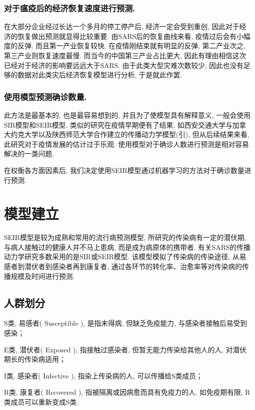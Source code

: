 \documentclass[lang=cn,11pt]{elegantpaper}
\begin{document}
\subsubsection*{对于瘟疫后的经济恢复速度进行预测. }
在大部分企业经过长达一个多月的停工停产后, 经济一定会受到重创, 因此对于经济的恢复做出预测就显得比较重要. 由SARS后的恢复曲线来看, 疫情过后会有小幅度的反弹. 而且第一产业恢复较快, 在疫情刚结束就有明显的反弹, 第二产业次之, 第三产业则恢复速度最慢. 而当今的中国第三产业占比更大, 因此有理由相信这次已经对于经济的影响要远远大于SARS. 由于此类大型灾难次数较少, 因此也没有足够的数据对此类灾后经济恢复模型进行分析, 于是就此作罢. 
\subsubsection*{使用模型预测确诊数量. }
此方法是最基本的, 也是最容易想到的, 并且为了使模型具有解释意义, 一般会使用SIR模型和SEIR模型. 类似的研究在疫情早期便有了结果, 如西安交通大学与加拿大约克大学以及陕西师范大学合作建立的传播动力学模型(引), 但从后续结果来看, 此研究对于疫情发展的估计过于乐观. 使用模型对于确诊人数进行预测是相对容易解决的一类问题. 

在权衡各方面因素后, 我们决定使用SEIR模型通过机器学习的方法对于确诊数量进行预测.
\section{模型建立} 
SEIR模型是较为成熟和常用的流行病预测模型, 所研究的传染病有一定的潜伏期, 与病人接触过的健康人并不马上患病, 而是成为病原体的携带者. 有关SARS的传播动力学研究多数采用的是SIR或SEIR模型. 该模型模拟了传染病的传染途径, 从易感者到潜伏者到感染者再到康复者, 通过各环节的转化率、治愈率等对传染病的传播规模及时间进行预测. 
\subsection{人群划分}
S类, 易感者( Susceptible ), 是指未得病, 但缺乏免疫能力, 与感染者接触后易受到感染；

E类, 潜伏者( Exposed ), 指接触过感染者, 但暂无能力传染给其他人的人, 对潜伏期长的传染病适用；

I类, 感染者( Infective ), 指染上传染病的人, 可以传播给S类成员；

R类, 康复者( Recovered ), 指被隔离或因病愈而具有免疫力的人. 如免疫期有限, R类成员可以重新变成S类.
\end{document}
